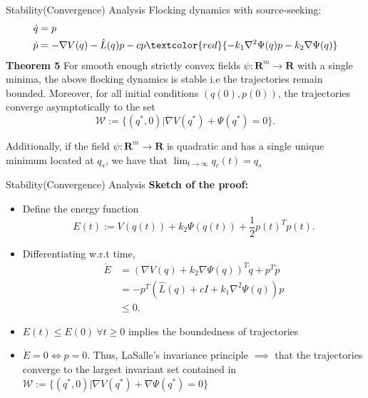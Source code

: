 \begin{frame}{Stability(Convergence) Analysis}
	Flocking dynamics with source-seeking:
	\begin{equation*}
	\begin{split}
	\Dot{q}&=p\\
	\Dot{p}&=-\nabla V(q)-\hat{L}(q)p -cp\textcolor{red}{-k_1\nabla^2 \Psi(q) p -k_2 \nabla \Psi(q)}
	\end{split}
	\end{equation*}
\textbf{Theorem 5} For smooth enough strictly convex fields $\psi:\mathbf{R}^m \xrightarrow{} \mathbf{R}$ with a single minima, the above flocking dynamics is stable i.e the trajectories remain bounded. Moreover, for all initial conditions $(q(0),p(0))$, the trajectories converge asymptotically to the set $$\mathcal{W}:=\{(q^*,0)|\nabla V (q^*)+ \Psi(q^*) = 0 \}.$$

Additionally, if the field $\psi:\mathbf{R}^m \xrightarrow{} \mathbf{R}$ is quadratic and has a single unique minimum located at $q_s$, we have that $\lim_{t\rightarrow \infty}q_c(t)=q_s$
\end{frame}
\begin{frame}{Stability(Convergence) Analysis}
\textbf{Sketch of the proof:}
	\begin{itemize}
		\item Define the energy function
		\begin{equation*}\label{eqn: energy function}
		E(t):= V(q(t)) + k_2\Psi(q(t)) + \frac{1}{2}p(t)^Tp(t).
		\end{equation*}
		\pause
		\item Differentiating w.r.t time, 
		\begin{equation*}
		\begin{split}
		\dot{E}&= (\nabla V(q) + k_2\nabla \Psi(q))^T\dot{q} + p^T\dot{p} \\
		&=-p^T(\hat{L}(q)+cI+k_1\nabla^2\Psi(q))p\\
		&\leq 0.
		\end{split}
		\end{equation*}
		\pause
		\item $E(t)\leq E(0) ~\forall t\geq0$ implies the boundedness of trajectories
		\pause
		\item  $\dot{E}=0 \iff p=0$. Thus, LaSalle's invariance principle $\implies$ that the trajectories converge to the largest invariant set contained in $\mathcal{W}:=\{(q^*,0)|\nabla V (q^*)+ \nabla \Psi(q^*) = 0 \}$
	\end{itemize}
\end{frame}
